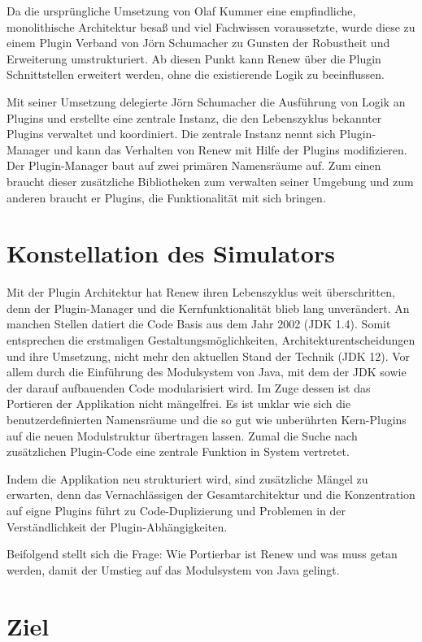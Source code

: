 Da die ursprüngliche Umsetzung von Olaf Kummer eine empfindliche, monolithische Architektur besaß und viel Fachwissen voraussetzte, wurde diese zu einem Plugin Verband von Jörn Schumacher zu Gunsten der Robustheit und Erweiterung umstrukturiert. Ab diesen Punkt kann Renew über die Plugin Schnittstellen erweitert werden, ohne die existierende Logik zu beeinflussen.\bigbreak


Mit seiner Umsetzung delegierte Jörn Schumacher die Ausführung von Logik an Plugins und erstellte eine zentrale Instanz, die den Lebenszyklus bekannter Plugins verwaltet und koordiniert. Die zentrale Instanz nennt sich Plugin-Manager und kann das Verhalten von Renew mit Hilfe der Plugins modifizieren. Der Plugin-Manager baut auf zwei primären Namensräume auf. Zum einen braucht dieser zusätzliche Bibliotheken zum verwalten seiner Umgebung und zum anderen braucht er Plugins, die Funktionalität mit sich bringen.


\section{Konstellation des Simulators} \label{sec:KdS}

Mit der Plugin Architektur hat Renew ihren Lebenszyklus weit überschritten, denn der Plugin-Manager und die Kernfunktionalität blieb lang unverändert. An manchen Stellen datiert die Code Basis aus dem Jahr 2002 (JDK 1.4). Somit entsprechen die erstmaligen Gestaltungsmöglichkeiten, Architekturentscheidungen und ihre Umsetzung, nicht mehr den aktuellen Stand der Technik (JDK 12). Vor allem durch die Einführung des Modulsystem von Java, mit dem der JDK sowie der darauf aufbauenden Code modularisiert wird. Im Zuge dessen ist das Portieren der Applikation nicht mängelfrei. Es ist unklar wie sich die benutzerdefinierten Namensräume und die so gut wie unberührten Kern-Plugins auf die neuen Modulstruktur übertragen lassen. Zumal die Suche nach zusätzlichen Plugin-Code eine zentrale Funktion in System vertretet.\bigbreak


Indem die Applikation neu strukturiert wird, sind zusätzliche Mängel zu erwarten, denn das Vernachlässigen der Gesamtarchitektur und die Konzentration auf eigne Plugins führt zu Code-Duplizierung und Problemen in der Verständlichkeit der Plugin-Abhängigkeiten.

Beifolgend stellt sich die Frage: Wie Portierbar ist Renew und was muss getan werden, damit der Umstieg auf das Modulsystem von Java gelingt.

\section{Ziel} \label{sec:Z}

